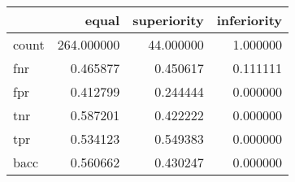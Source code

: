 \begin{tabular}{lrrr}
\toprule
{} &       equal &  superiority &  inferiority \\
\midrule
count &  264.000000 &    44.000000 &     1.000000 \\
fnr   &    0.465877 &     0.450617 &     0.111111 \\
fpr   &    0.412799 &     0.244444 &     0.000000 \\
tnr   &    0.587201 &     0.422222 &     0.000000 \\
tpr   &    0.534123 &     0.549383 &     0.000000 \\
bacc  &    0.560662 &     0.430247 &     0.000000 \\
\bottomrule
\end{tabular}

